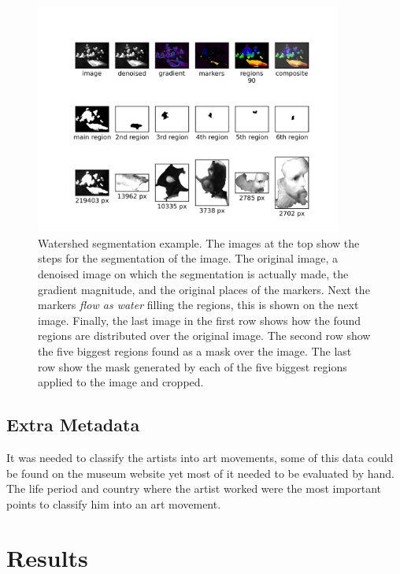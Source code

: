 \documentclass[11pt,a4paper,draft]{report}
\begin{document}
\begin{multicols}{2}
\begin{figure}
\centering
\includegraphics[width=0.9\textwidth]{segm_rembrandt_eu_464}
\caption[Watershed segmentation example]{Watershed segmentation example.  The
images at the top show the steps for the segmentation of the image.  The
original image, a denoised image on which the segmentation is actually made,
the gradient magnitude, and the original places of the markers.  Next the
markers \emph{flow as water} filling the regions, this is shown on the next
image.  Finally, the last image in the first row shows how the found regions
are distributed over the original image.  The second row show the five biggest
regions found as a mask over the image.  The last row show the mask generated
by each of the five biggest regions applied to the image and cropped.}
\label{fig:segm}
\end{figure}

\section{Extra Metadata}

It was needed to classify the artists into art movements, some of this data
could be found on the museum website yet most of it needed to be evaluated by
hand.  The life period and country where the artist worked were the most
important points to classify him into an art movement.

\end{multicols}

\chapter{Results}
\label{chap:results}
\end{document}
